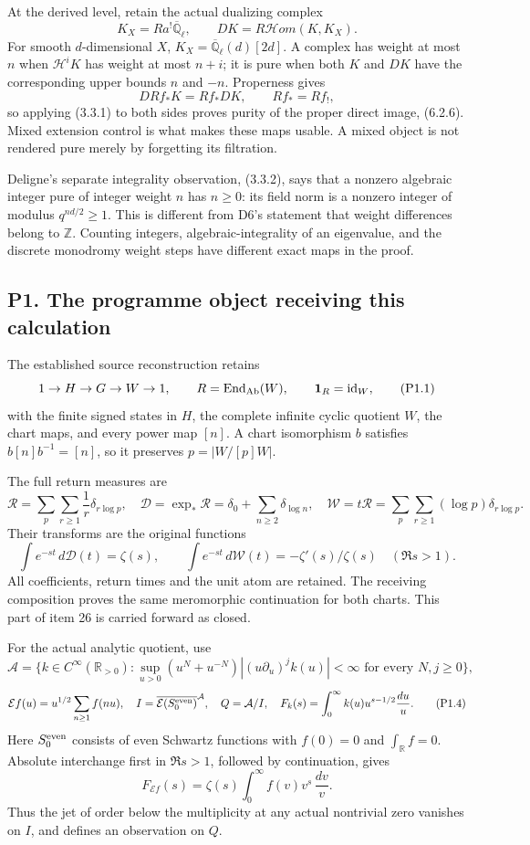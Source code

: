 At the derived level, retain the actual dualizing complex \[
K_X=Ra^!\overline{\mathbb Q}_\ell,\qquad
DK=R\mathcal Hom(K,K_X).
\] For smooth \(d\)-dimensional \(X\),
\(K_X=\overline{\mathbb Q}_\ell(d)[2d]\). A complex has weight at most
\(n\) when \(\mathcal H^iK\) has weight at most \(n+i\); it is pure when
both \(K\) and \(DK\) have the corresponding upper bounds \(n\) and
\(-n\). Properness gives \[
DRf_*K=Rf_*DK,\qquad Rf_*=Rf_!,
\tag{D7.4}
\] so applying (3.3.1) to both sides proves purity of the proper direct
image, (6.2.6). Mixed extension control is what makes these maps usable.
A mixed object is not rendered pure merely by forgetting its filtration.

Deligne's separate integrality observation, (3.3.2), says that a nonzero
algebraic integer pure of integer weight \(n\) has \(n\ge0\): its field
norm is a nonzero integer of modulus \(q^{nd/2}\ge1\). This is different
from D6's statement that weight differences belong to \(\mathbb Z\).
Counting integers, algebraic-integrality of an eigenvalue, and the
discrete monodromy weight steps have different exact maps in the proof.

\subsection{P1. The programme object receiving this
calculation}\label{p1.-the-programme-object-receiving-this-calculation}

The established source reconstruction retains \[
1\to H\to G\to W\to1,\qquad
R=\operatorname{End}_{\rm Ab}(W),\qquad
\mathbf1_R=\operatorname{id}_W,
\tag{P1.1}
\] with the finite signed states in \(H\), the complete infinite cyclic
quotient \(W\), the chart maps, and every power map \([n]\). A chart
isomorphism \(b\) satisfies \(b[n]b^{-1}=[n]\), so it preserves
\(p=|W/[p]W|\).

The full return measures are \[
\mathcal R=\sum_p\sum_{r\ge1}\frac1r\delta_{r\log p},
\quad
\mathcal D=\exp_*\mathcal R=\delta_0+\sum_{n\ge2}\delta_{\log n},
\quad
\mathcal W=t\mathcal R=\sum_p\sum_{r\ge1}(\log p)\delta_{r\log p}.
\tag{P1.2}
\] Their transforms are the original functions \[
\int e^{-st}\,d\mathcal D(t)=\zeta(s),\qquad
\int e^{-st}\,d\mathcal W(t)=-\zeta'(s)/\zeta(s)
\quad(\Re s>1).
\tag{P1.3}
\] All coefficients, return times and the unit atom are retained. The
receiving composition proves the same meromorphic continuation for both
charts. This part of item 26 is carried forward as closed.

For the actual analytic quotient, use \[
\mathcal A=\{k\in C^\infty(\mathbb R_{>0}):
\sup_{u>0}(u^N+u^{-N})|(u\partial_u)^jk(u)|<\infty
\text{ for every }N,j\ge0\},
\] \[
\mathcal E f(u)=u^{1/2}\sum_{n\ge1}f(nu),\quad
I=\overline{\mathcal E(S^{\rm even}_0)}^{\mathcal A},\quad Q=\mathcal A/I,
\quad
F_k(s)=\int_0^\infty k(u)u^{s-1/2}\frac{du}{u}.
\tag{P1.4}
\] Here \(S^{\rm even}_0\) consists of even Schwartz functions with
\(f(0)=0\) and \(\int_{\mathbb R}f=0\). Absolute interchange first in
\(\Re s>1\), followed by continuation, gives \[
F_{\mathcal E f}(s)=\zeta(s)\int_0^\infty f(v)v^s\,\frac{dv}{v}.
\tag{P1.5}
\] Thus the jet of order below the multiplicity at any actual nontrivial
zero vanishes on \(I\), and defines an observation on \(Q\).

